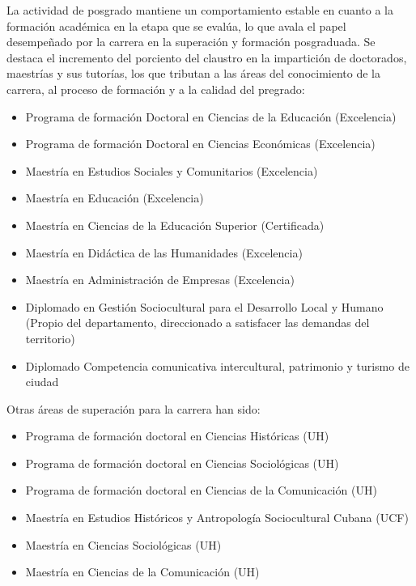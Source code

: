 La actividad de posgrado mantiene un comportamiento estable en cuanto a la formación académica en la etapa que se evalúa, lo que avala el papel desempeñado por la carrera en la superación y formación posgraduada. Se destaca el incremento del porciento del claustro en la impartición de doctorados, maestrías y sus tutorías, los que tributan a las áreas del conocimiento de la carrera, al proceso de formación y a la calidad del pregrado:

\begin{itemize}
	\setlength\itemsep{-0.5em}
	\item Programa de formación Doctoral en Ciencias de la Educación (Excelencia)
	\item Programa de formación Doctoral en Ciencias Económicas (Excelencia)
	\item Maestría en Estudios Sociales y Comunitarios (Excelencia)
	\item Maestría en Educación (Excelencia)
	\item Maestría en Ciencias de la Educación Superior (Certificada)
	\item Maestría en Didáctica de las Humanidades (Excelencia)
	\item Maestría en Administración de Empresas (Excelencia)
	\item Diplomado en Gestión Sociocultural para el Desarrollo Local y Humano (Propio del departamento, direccionado a satisfacer las demandas del territorio)
	\item Diplomado Competencia comunicativa intercultural, patrimonio y turismo de ciudad
\end{itemize}

Otras áreas de superación para la carrera han sido:

\begin{itemize}
	\setlength\itemsep{-0.5em}
	\item Programa de formación doctoral en Ciencias Históricas (UH)
	\item Programa de formación doctoral en Ciencias Sociológicas (UH)
	\item Programa de formación doctoral en Ciencias de la Comunicación (UH)
	\item Maestría en Estudios Históricos y Antropología Sociocultural Cubana (UCF)
	\item Maestría en Ciencias Sociológicas (UH)
	\item Maestría en Ciencias de la Comunicación (UH)
\end{itemize}